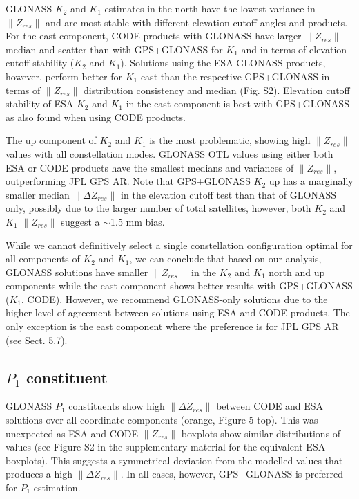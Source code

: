 \documentclass[se, manuscript]{copernicus}
\begin{document}
GLONASS $K_2$ and $K_1$ estimates in the north have the lowest variance in $\|Z_{res}\|$ and are most stable with different elevation cutoff angles and products. For the east component, CODE products with GLONASS have larger $\|Z_{res}\|$ median and scatter than with GPS+GLONASS for $K_1$ and in terms of elevation cutoff stability ($K_2$ and $K_1$). Solutions using the ESA GLONASS products, however, perform better for $K_1$ east than the respective GPS+GLONASS in terms of $\|Z_{res}\|$ distribution consistency and median (Fig. S2). Elevation cutoff stability of ESA $K_2$ and $K_1$ in the east component is best with GPS+GLONASS as also found when using CODE products.

The up component of $K_2$ and $K_1$ is the most problematic, showing high $\|Z_{res}\|$ values with all constellation modes. GLONASS OTL values using either both ESA or CODE products have the smallest medians and variances of $\|Z_{res}\|$, outperforming JPL GPS AR. Note that GPS+GLONASS $K_2$ up has a marginally smaller median $\|\Delta Z_{res}\|$ in the elevation cutoff test than that of GLONASS only, possibly due to the larger number of total satellites, however, both $K_2$ and $K_1$ $\|Z_{res}\|$ suggest a $\sim$1.5 mm bias.

While we cannot definitively select a single constellation configuration optimal for all components of $K_2$ and $K_1$, we can conclude that based on our analysis, GLONASS solutions have smaller $\|Z_{res}\|$ in the $K_2$ and $K_1$ north and up components while the east component shows better results with GPS+GLONASS ($K_1$, CODE). However, we recommend GLONASS-only solutions due to the higher level of agreement between solutions using ESA and CODE products. The only exception is the east component where the preference is for JPL GPS AR (see Sect. 5.7).

\subsection{$P_1$ constituent}
GLONASS $P_1$ constituents show high $\|\Delta Z_{res}\|$ between CODE and ESA solutions over all coordinate components (orange, Figure 5 top). This was unexpected as ESA and CODE $\|Z_{res}\|$ boxplots show similar distributions of values (see Figure S2 in the supplementary material for the equivalent ESA boxplots). This suggests a symmetrical deviation from the modelled values that produces a high $\|\Delta Z_{res}\|$. In all cases, however, GPS+GLONASS is preferred for $P_1$ estimation.
\end{document}
